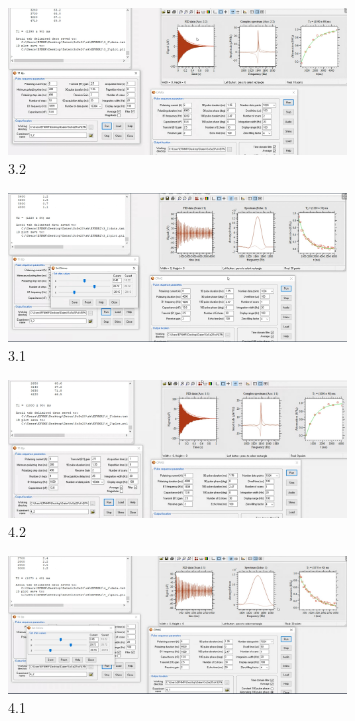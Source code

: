     \begin{figure}[H]
        \centering
        \includegraphics[width = 0.8\textwidth]{Screenshot2/3_2.jpg}
        \caption{3.2}
    \end{figure}
    \begin{figure}[H]
        \centering
        \includegraphics[width = 0.8\textwidth]{Screenshot2/3_1.jpg}
        \caption{3.1}
    \end{figure}
    \begin{figure}[H]
        \centering
        \includegraphics[width = 0.8\textwidth]{Screenshot2/4_2.jpg}
        \caption{4.2}
    \end{figure}
    \begin{figure}[H]
        \centering
        \includegraphics[width = 0.8\textwidth]{Screenshot2/4_1.jpg}
        \caption{4.1}
    \end{figure}
